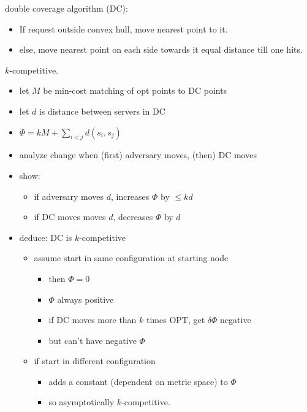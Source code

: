 \documentclass{article}
\begin{document}
double coverage algorithm (DC):
\begin{itemize}
\item 
If request outside convex hull, move nearest point to it.

\item else, move nearest point on each side towards it equal distance
  till one hits.
\end{itemize}

$k$-competitive. 
\begin{itemize}
\item let $M$ be min-cost matching of opt points to DC points
\item let $d$ is distance between servers in DC
\item $\Phi=kM+\sum_{i < j}d(s_i,s_j)$
\item analyze change when (first) adversary moves, (then) DC moves
\item show: 
\begin{itemize}
\item if adversary moves $d$, increases $\Phi$ by $\le kd$
\item if DC moves moves $d$, decreases $\Phi$ by $d$
\end{itemize}
\item deduce: DC is $k$-competitive 
\begin{itemize}
\item assume start in same configuration at starting node
\begin{itemize}
\item then $\Phi=0$
\item $\Phi$ always positive
\item if DC moves more than $k$ times OPT, get $\delta\Phi$ negative
\item but can't have negative $\Phi$
\end{itemize}
\item if start in different configuration
\begin{itemize}
\item adds a constant (dependent
  on metric space) to $\Phi$
\item so asymptotically $k$-competitive.
\end{itemize}
\end{itemize}
\end{itemize}
\end{document}
